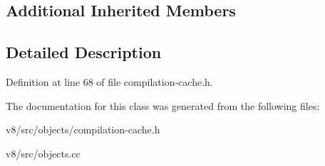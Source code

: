 \subsection*{Additional Inherited Members}


\subsection{Detailed Description}


Definition at line 68 of file compilation-\/cache.\+h.



The documentation for this class was generated from the following files\+:\begin{DoxyCompactItemize}
\item 
v8/src/objects/compilation-\/cache.\+h\item 
v8/src/objects.\+cc\end{DoxyCompactItemize}
